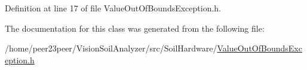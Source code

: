 Definition at line 17 of file Value\+Out\+Of\+Bounds\+Exception.\+h.



The documentation for this class was generated from the following file\+:\begin{DoxyCompactItemize}
\item 
/home/peer23peer/\+Vision\+Soil\+Analyzer/src/\+Soil\+Hardware/\hyperlink{_value_out_of_bounds_exception_8h}{Value\+Out\+Of\+Bounds\+Exception.\+h}\end{DoxyCompactItemize}
